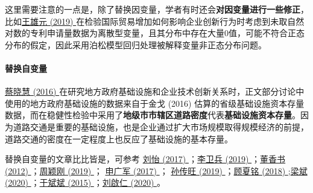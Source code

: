 \documentclass[11pt,a4paper]{ctexart}
\begin{document}
这里需要注意的一点是，除了替换因变量，学者有时还会\textbf{对因变量进行一些修正}，比如\href{https://xueshu.baidu.com/usercenter/paper/show?paperid=1d380vh0gr5x0080aj3c0tf0h6028132&site=xueshu_se}{王雄元
(2019)
}在检验国际贸易增加如何影响企业创新行为时考虑到未取自然对数的专利申请量数据为离散型变量，且其分布中存在大量0值，可能不符合正态分布的假定，因此采用泊松模型回归处理被解释变量非正态分布问题。

\paragraph{替换自变量}

\href{https://xueshu.baidu.com/usercenter/paper/show?paperid=0f2b233eb96ada98f02353ef66f55944&site=xueshu_se}{蔡晓慧
(2016)
}在研究地方政府基础设施和企业技术创新关系时，正文部分讨论中使用的地方政府基础设施的数据来自于金戈
(2016)
估算的省级基础设施资本存量数据，而在稳健性检验中采用了\textbf{地级市市辖区道路密度}代表\textbf{基础设施资本存量}。因为道路交通是重要的基础设施，也是企业通过扩大市场规模取得规模经济的前提，道路交通的密度在一定程度上也反应了基础设施的基本存量。

替换自变量的文章比比皆是，可参考
\href{https://xueshu.baidu.com/usercenter/paper/show?paperid=06871935e1791622e676c9d631b805e9&site=xueshu_se&hitarticle=1}{刘怡
(2017)
}；\href{https://xueshu.baidu.com/usercenter/paper/show?paperid=1a770p60a52b0ec0225k0ew0mx070151&site=xueshu_se}{李卫兵
(2019)
}；\href{https://xueshu.baidu.com/usercenter/paper/show?paperid=5f03a6f251f8ce6edb56acb7e292f2ea}{董香书
(2012)
}；\href{https://xueshu.baidu.com/usercenter/paper/show?paperid=1f5s0rq0630m0230545504p0bv194162&site=xueshu_se}{周颖刚
(2019) }；
\href{https://xueshu.baidu.com/usercenter/paper/show?paperid=8ca57feeb5e87f750d004a878f78de3e&site=xueshu_se&hitarticle=1}{申广军
(2017) }；
\href{https://xueshu.baidu.com/usercenter/paper/show?paperid=1e2c0820qa0900c0cg270m007d398523&site=xueshu_se}{孙传旺
(2019)
}；\href{https://xueshu.baidu.com/usercenter/paper/show?paperid=6f34956fcbe0e795413e03179f070103&site=xueshu_se}{顾夏铭
(2018)
};\href{https://kns.cnki.net/KCMS/detail/detail.aspx?dbcode=CJFQ&dbname=CJFDLAST2020&filename=JJYJ202003015&uid=WEEvREcwSlJHSldRa1FhcTdnTnhYWUN2MXh5K2o3djRZWGhKYtextbfJWkg1cz0=$9A4hF_YAuvQ5obgVAqNKPCYcEjKensW4IQMovwHtwkF4VYPoHbKxJw!!&v=MzAwOTJUM3FUcldNMUZyQ1VSN3FmWU9SdEZ5M2xXcjNQTHlmU1pMRzRITkhNckk5RVlZUjhlWDFMdXhZUzdEaDE=}{梁斌
(2020)
}；\href{https://xueshu.baidu.com/usercenter/paper/show?paperid=901ebb638fad48d407ad0a44517ae1e4&site=xueshu_se}{于斌斌
(2015)
}；\href{https://xueshu.baidu.com/usercenter/paper/show?paperid=9e6588d93f28008df07c5e43d7e29211&site=xueshu_se&hitarticle=1}{刘啟仁
(2020) }。
\end{document}
